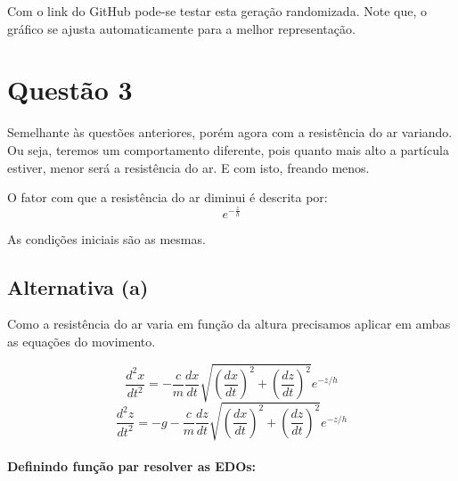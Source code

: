 \documentclass[12pt]{article}
\begin{document}
Com o link do GitHub pode-se testar esta geração randomizada. Note que,
o gráfico se ajusta automaticamente para a melhor representação.

\hypertarget{questuxe3o-3}{%
\section{Questão 3}\label{questuxe3o-3}}

Semelhante às questões anteriores, porém agora com a resistência do ar
variando. Ou seja, teremos um comportamento diferente, pois quanto mais
alto a partícula estiver, menor será a resistência do ar. E com isto,
freando menos.

O fator com que a resistência do ar diminui é descrita por:
\[e^{-\frac{z}{h}}\]

As condições iniciais são as mesmas.

\hypertarget{alternativa-a}{%
\subsection{Alternativa (a)}\label{alternativa-a}}

Como a resistência do ar varia em função da altura precisamos aplicar em
ambas as equações do movimento.

\[ \frac{d^2x}{dt^2} = - \frac{c}{m} \frac{dx}{dt}\sqrt{\left(\frac{dx}{dt} \right)^2 + \left(\frac{dz}{dt} \right)^2} e^{-z/h}
\]
\[\frac{d^2z}{dt^2} = - g - \frac{c}{m} \frac{dz}{dt}\sqrt{\left(\frac{dx}{dt} \right)^2 + \left(\frac{dz}{dt} \right)^2} e^{-z/h}
\]

\hypertarget{definindo-funuxe7uxe3o-par-resolver-as-edos}{%
\paragraph{Definindo função par resolver as
EDOs:}\label{definindo-funuxe7uxe3o-par-resolver-as-edos}}
\end{document}
